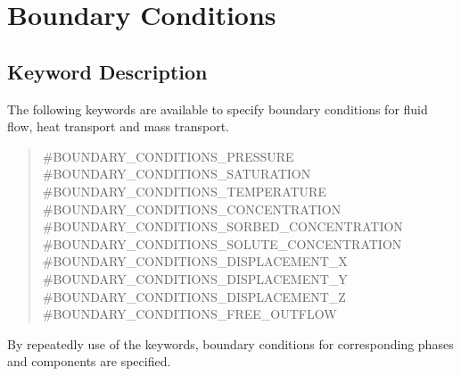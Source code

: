\section{Boundary Conditions}
\subsection{Keyword Description}

The following keywords are available to specify boundary conditions for fluid flow,
heat transport and mass transport.

\begin{verse}
 \#BOUNDARY\_CONDITIONS\_PRESSURE      \\
 \#BOUNDARY\_CONDITIONS\_SATURATION    \\
 \#BOUNDARY\_CONDITIONS\_TEMPERATURE   \\
 \#BOUNDARY\_CONDITIONS\_CONCENTRATION \\
 \#BOUNDARY\_CONDITIONS\_SORBED\_CONCENTRATION  \\
 \#BOUNDARY\_CONDITIONS\_SOLUTE\_CONCENTRATION  \\
 \#BOUNDARY\_CONDITIONS\_DISPLACEMENT\_X        \\
 \#BOUNDARY\_CONDITIONS\_DISPLACEMENT\_Y        \\
 \#BOUNDARY\_CONDITIONS\_DISPLACEMENT\_Z        \\
 \#BOUNDARY\_CONDITIONS\_FREE\_OUTFLOW          \\
\end{verse}

By repeatedly use of the keywords, boundary conditions for corresponding phases and components are specified.


